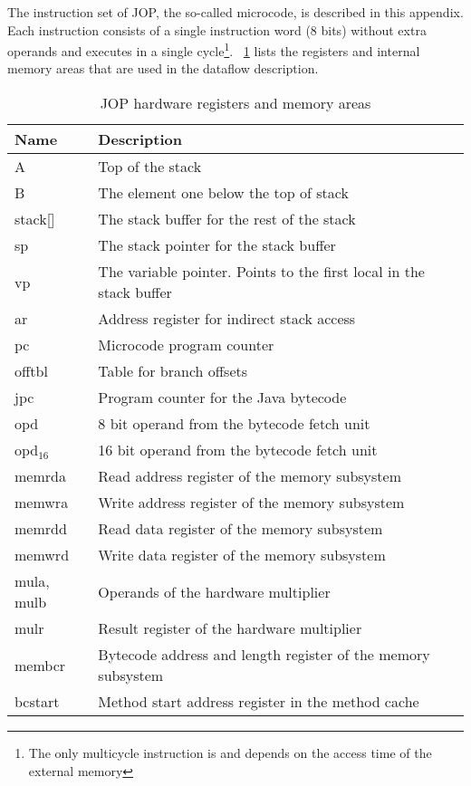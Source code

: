 %

The instruction set of JOP, the so-called microcode, is described in
this appendix. Each instruction consists of a single instruction
word (8 bits) without extra operands and executes in a single
cycle\footnote{The only multicycle instruction is 
and depends on the access time of the external memory}.
\tablename~\ref{tab:appendix:hwreg} lists the registers and internal
memory areas that are used in the dataflow description.

\begin{table}[h]
  \centering
  \begin{tabular}{ll}
    \toprule
    Name & Description \\
    \midrule
    A & Top of the stack\\
    B & The element one below the top of stack\\
    stack[] & The stack buffer for the rest of the stack\\
    sp & The stack pointer for the stack buffer\\
    vp & The variable pointer. Points to the first local in
    the stack buffer\\
    ar & Address register for indirect stack access\\
    pc & Microcode program counter\\
    offtbl & Table for branch offsets\\
    jpc & Program counter for the Java bytecode\\
    opd & 8 bit operand from the bytecode fetch unit\\
    opd$_{16}$ & 16 bit operand from the bytecode fetch unit\\
    memrda & Read address register of the memory subsystem\\
    memwra & Write address register of the memory subsystem\\
    memrdd & Read data register of the memory subsystem\\
    memwrd & Write data register of the memory subsystem\\
    mula, mulb & Operands of the hardware multiplier\\
    mulr & Result register of the hardware multiplier\\
    membcr & Bytecode address and length register of the memory
    subsystem\\
    bcstart & Method start address register in the method cache\\
    \bottomrule
  \end{tabular}
  \caption{JOP hardware registers and memory areas}\label{tab:appendix:hwreg}
\end{table}

\clearpage



%
